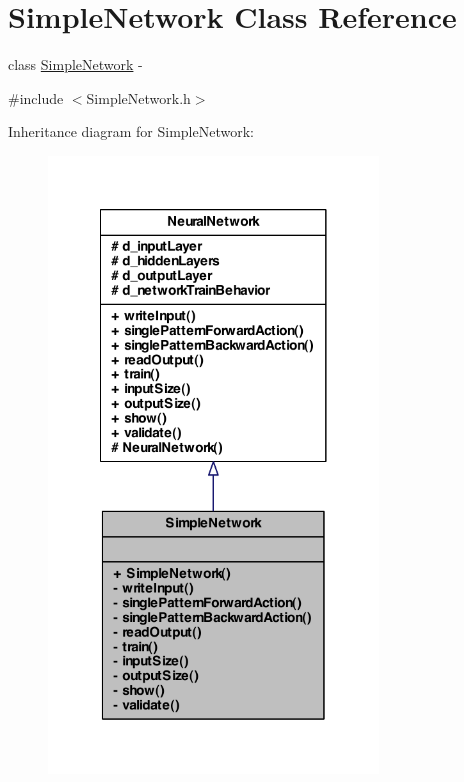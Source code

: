\hypertarget{class_simple_network}{
\section{SimpleNetwork Class Reference}
\label{class_simple_network}
}


class \hyperlink{class_simple_network}{SimpleNetwork} -\/  




{\ttfamily \#include $<$SimpleNetwork.h$>$}



Inheritance diagram for SimpleNetwork:
\nopagebreak
\begin{figure}[H]
\begin{center}
\leavevmode
\includegraphics[width=248pt]{class_simple_network__inherit__graph}
\end{center}
\end{figure}


